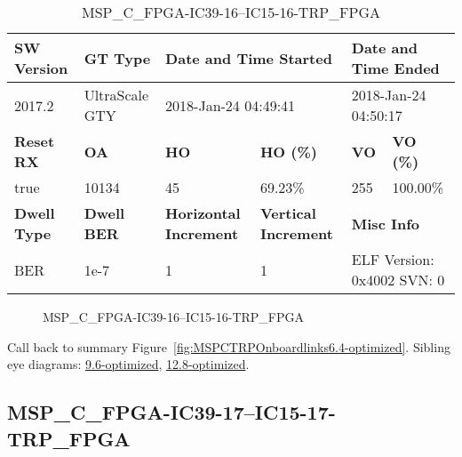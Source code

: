 \begin{table}[h]
\centering
\caption{MSP\_C\_FPGA-IC39-16--IC15-16-TRP\_FPGA}
\label{tab:MSPCFPGAIC3916IC1516TRPFPGA6.4-optimized}
\begin{tabular}{@{}|l|l|l|l|l|l|@{}}
\toprule
\textbf{SW Version}                & \textbf{GT Type}   & \multicolumn{2}{l|}{\textbf{Date and Time Started}}            & \multicolumn{2}{l|}{\textbf{Date and Time Ended}}        \\ \midrule
2017.2                       & UltraScale GTY          & \multicolumn{2}{l|}{2018-Jan-24 04:49:41}                   & \multicolumn{2}{l|}{2018-Jan-24 04:50:17}               \\ \midrule
\textbf{Reset RX}                  & \textbf{OA} & \textbf{HO}   & \textbf{HO (\%)} & \textbf{VO} & \textbf{VO (\%)} \\ \midrule
true & 10134        & 45          & 69.23\%        & 255        & 100.00\%       \\ \midrule
\textbf{Dwell Type}                & \textbf{Dwell BER} & \textbf{Horizontal Increment} & \textbf{Vertical Increment}    & \multicolumn{2}{l|}{\textbf{Misc Info}}                  \\ \midrule
BER                            & 1e-7        & 1        & 1           & \multicolumn{2}{l|}{ELF Version: 0x4002 SVN: 0}                         \\ \bottomrule
\end{tabular}
\end{table}

\begin{figure}[h]
\caption{MSP\_C\_FPGA-IC39-16--IC15-16-TRP\_FPGA} \label{fig:MSPCFPGAIC3916IC1516TRPFPGA6.4-optimized}
\end{figure}

Call back to summary Figure~\ref{fig:MSPCTRPOnboardlinks6.4-optimized}.
Sibling eye diagrams: \hyperref[sec:MSPCFPGAIC3916IC1516TRPFPGA9.6-optimized]{9.6-optimized}, \hyperref[sec:MSPCFPGAIC3916IC1516TRPFPGA12.8-optimized]{12.8-optimized}.

\clearpage
\newpage


\subsection{MSP\_C\_FPGA-IC39-17--IC15-17-TRP\_FPGA}\label{sec:MSPCFPGAIC3917IC1517TRPFPGA6.4-optimized}

